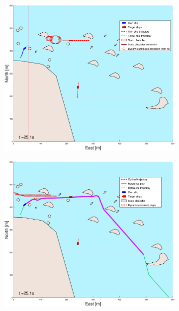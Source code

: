 \clearpage
\begin{figure}[!ht] %
    \begin{subfigure}[b]{0.49\textwidth}
        \centering
        \includegraphics[width=\textwidth]{Images/Figures/skjergard_m_trafikk_NEW/_Simple_0fig1_time=25}
    \end{subfigure}
    \hfill
    \begin{subfigure}[b]{0.499\textwidth}
        \centering
        \includegraphics[width=\textwidth]{Images/Figures/skjergard_m_trafikk_NEW/_Simple_0fig999_time=25}

\end{subfigure}
\end{figure}
